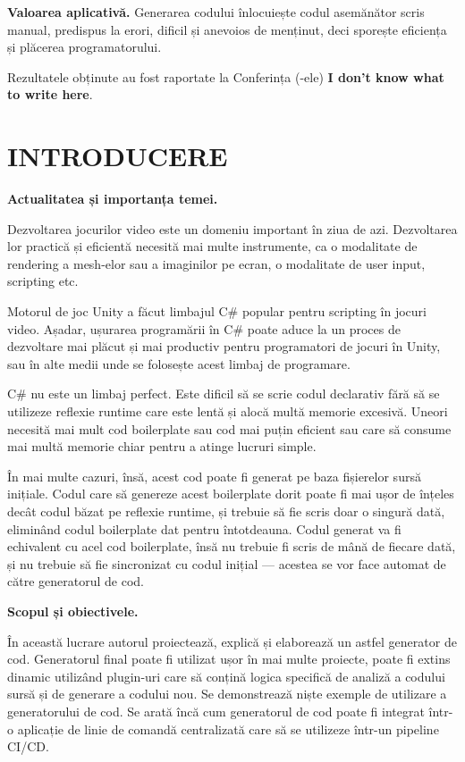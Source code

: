 \documentclass[a4paper,12pt]{report}
\def\oldchapter{} \let\oldchapter=\chapter{}
\def\chapter{\stepcounter{num_chapters}\oldchapter}
\newcommand{\unnumberedChapter}[1]{%
  \chapter*{#1}
  \addcontentsline{toc}{chapter}{#1}}
\newcommand{\conferencesList}{I don't know what to write here}
\begin{document}
\textbf{Valoarea aplicativă.} Generarea codului înlocuiește codul asemănător scris manual, predispus la erori, dificil și anevoios de menținut, deci sporește eficiența și plăcerea programatorului.


Rezultatele obținute au fost raportate la Conferința (-ele) \textbf{\conferencesList}.


\unnumberedChapter{INTRODUCERE}


\textbf{Actualitatea și importanța temei.}

Dezvoltarea jocurilor video este un domeniu important în ziua de azi.
Dezvoltarea lor practică și eficientă necesită mai multe instrumente, ca o modalitate de rendering a mesh-elor sau a imaginilor pe ecran, o modalitate de user input, scripting etc.

Motorul de joc Unity a făcut limbajul C\# popular pentru scripting în jocuri video.
Așadar, ușurarea programării în C\# poate aduce la un proces de dezvoltare mai plăcut și mai productiv pentru programatori de jocuri în Unity, sau în alte medii unde se folosește acest limbaj de programare.

C\# nu este un limbaj perfect.
Este dificil să se scrie codul declarativ fără să se utilizeze reflexie runtime care este lentă și alocă multă memorie excesivă.
Uneori necesită mai mult cod boilerplate sau cod mai puțin eficient sau care să consume mai multă memorie chiar pentru a atinge lucruri simple.

În mai multe cazuri, însă, acest cod poate fi generat pe baza fișierelor sursă inițiale.
Codul care să genereze acest boilerplate dorit poate fi mai ușor de înțeles decât codul băzat pe reflexie runtime, și trebuie să fie scris doar o singură dată, eliminând codul boilerplate dat pentru întotdeauna.
Codul generat va fi echivalent cu acel cod boilerplate, însă nu trebuie fi scris de mână de fiecare dată, și nu trebuie să fie sincronizat cu codul inițial — acestea se vor face automat de către generatorul de cod.


\textbf{Scopul și obiectivele.}

În această lucrare autorul proiectează, explică și elaborează un astfel generator de cod.
Generatorul final poate fi utilizat ușor în mai multe proiecte, poate fi extins dinamic utilizând plugin-uri care să conțină logica specifică de analiză a codului sursă și de generare a codului nou.
Se demonstrează niște exemple de utilizare a generatorului de cod.
Se arată încă cum generatorul de cod poate fi integrat într-o aplicație de linie de comandă centralizată care să se utilizeze într-un pipeline \ac{CI/CD}.
\end{document}
